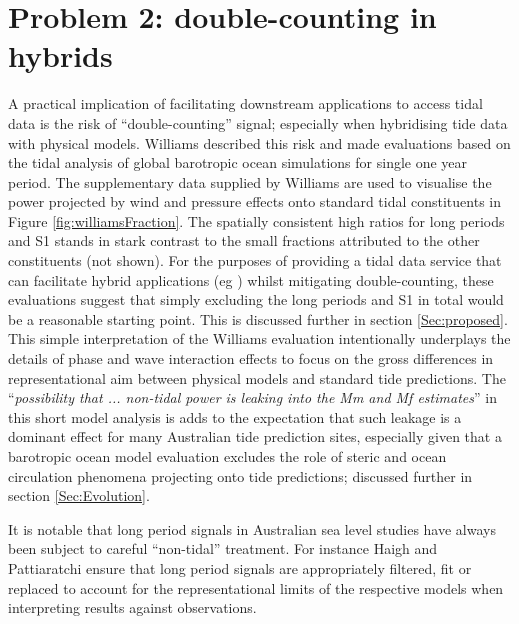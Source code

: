 \section{Problem 2: double-counting in hybrids}
\label{Sec:DoubleCount}
A practical implication of facilitating downstream applications to access tidal data is the risk of ``double-counting'' signal; especially when hybridising tide data with physical models. 
Williams \citep{10.5194/os-2020-107} described this risk and made evaluations based on the tidal analysis of global barotropic ocean simulations for single one year period. 
The supplementary data supplied by Williams are used to visualise the power projected by wind and pressure effects onto standard tidal constituents in Figure \ref{fig:williamsFraction}.  The spatially consistent high ratios for long periods and S1 stands in stark contrast to the small fractions attributed to the other constituents (not shown).    
For the purposes of providing a tidal data service that can facilitate hybrid applications (eg \citep{Taylor:2017coa}) whilst mitigating double-counting, these evaluations suggest that simply excluding the long periods and S1 in total would be a reasonable starting point.   This is discussed further in  section \ref{Sec:proposed}.
This simple interpretation of the Williams evaluation intentionally underplays the details of phase and wave interaction effects to focus on the gross differences in representational aim between physical models and standard tide predictions. 
The ``\textit{possibility that ... non-tidal power is leaking into the Mm and Mf estimates}'' in this short model analysis is adds to the expectation that such leakage is a dominant effect for many Australian tide prediction sites, especially given that a barotropic ocean model evaluation excludes the role of steric and ocean circulation phenomena projecting onto tide predictions; discussed further in section \ref{Sec:Evolution}.

It is notable that long period signals in Australian sea level studies have always been subject to careful ``non-tidal'' treatment. For instance Haigh \citep{Haigh:2013bn} and Pattiaratchi \citep{Pattiaratchi2018} ensure that long period signals are appropriately filtered, fit or replaced to account for the representational limits of the respective models when interpreting results against observations.

